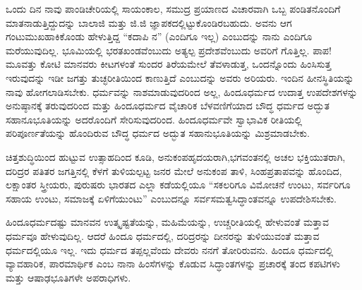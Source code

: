ಒಂದು ದಿನ ನಾವು ಪಾಂಡಿಚೇರಿಯಲ್ಲಿ ಸಾಯಂಕಾಲ, ಸಮುದ್ರ ಪ್ರಯಾಣದ ವಿಚಾರವಾಗಿ ಒಬ್ಬ ಪಂಡಿತನೊಂದಿಗೆ ಮಾತನಾಡುತ್ತಿದ್ದುದನ್ನು ಬಾಲಾಜಿ ಮತ್ತು ಜಿ.ಜಿ ಜ್ಞಾಪಕದಲ್ಲಿಟ್ಟುಕೊಂಡಿರಬಹುದು. ಅವನು ಆಗ ಗಂಟುಮುಖಹಾಕಿಕೊಂಡು ಹೇಳುತ್ತಿದ್ದ “ಕದಾಪಿ ನ” (ಎಂದಿಗೂ ಇಲ್ಲ) ಎಂಬುದನ್ನು ನಾನು ಎಂದಿಗೂ ಮರೆಯುವುದಿಲ್ಲ. ಭೂಮಿಯಲ್ಲಿ ಭರತಖಂಡವೆಂಬುದು ಅತ್ಯಲ್ಪ ಪ್ರದೇಶವೆಂಬುದು ಅವರಿಗೆ ಗೊತ್ತಿಲ್ಲ. ಪಾಪ!ಮೂವತ್ತು ಕೋಟಿ ಮಾನವರು ಕೀಟಗಳಂತೆ ಸುಂದರ ತಿರೆಯಮೇಲೆ ತೆವಳಾಡುತ್ತ, ಒಂದನ್ನೊಂದು ಹಿಂಸಿಸುತ್ತ ಇರುವುದನ್ನು ಇಡೀ ಜಗತ್ತು ತುಚ್ಛರೀತಿಯಿಂದ ಕಾಣುತ್ತಿದೆ ಎಂಬುದನ್ನು ಅವರು ಅರಿಯರು. ಇಂದಿನ ಹೀನಸ್ಥಿತಿಯನ್ನು ನಾವು ಹೋಗಲಾಡಿಸಬೇಕು. ಧರ್ಮವನ್ನು ನಾಶಮಾಡುವುದರಿಂದ ಅಲ್ಲ, ಹಿಂದೂಧರ್ಮದ ಉದಾತ್ತ ಉಪದೇಶಗಳನ್ನು ಅನುಷ್ಠಾನಕ್ಕೆ ತರುವುದರಿಂದ ಮತ್ತು ಹಿಂದೂಧರ್ಮದ ವೈಚಾರಿಕ ಬೆಳವಣಿಗೆಯಾದ ಬೌದ್ಧ ಧರ್ಮದ ಅದ್ಭುತ ಸಹಾನೂಭೂತಿಯನ್ನು ಅದರೊಂದಿಗೆ ಸೇರಿಸುವುದರಿಂದ. ಹಿಂದೂಧರ್ಮವೇ ಸ್ವಾಭಾವಿಕ ರೀತಿಯಲ್ಲಿ ಪರಿಪೂರ್ಣತೆಯನ್ನು ಹೊಂದಿರುವ ಬೌದ್ಧ ಧರ್ಮದ ಅದ್ಭುತ ಸಹಾನುಭೂತಿಯನ್ನು ಮಿಶ್ರಮಾಡಬೇಕು.

ಚಿತ್ತಶುದ್ಧಿಯಿಂದ ಹುಟ್ಟುವ ಉತ್ಸಾಹದಿಂದ ಕೂಡಿ, ಅನುಕಂಪಹೃದಯರಾಗಿ,\break ಭಗವಂತನಲ್ಲಿ ಅಚಲ ಭಕ್ತಿಯುತರಾಗಿ, ದರಿದ್ರರ ಪತಿತರ ಜಗತ್ತಿನಲ್ಲಿ ಕೆಳಗೆ ತುಳಿಯಲ್ಪಟ್ಟ ಜನರ ಮೇಲೆ ಅನುಕಂಪ ತಾಳಿ, ಸಿಂಹಪ್ರತಾಪವನ್ನು ಹೊಂದಿದ, ಲಕ್ಷಾಂತರ ಸ್ತ್ರೀಯರು, ಪುರುಷರು ಭಾರತದ ಎಲ್ಲಾ ಕಡೆಯಲ್ಲಿಯೂ “ಸಕಲರಿಗೂ ವಿಮೋಚನೆ ಉಂಟು, ಸರ್ವರಿಗೂ ಸಹಾಯ ಉಂಟು, ಸಮಾಜಕ್ಕೆ ಏಳಿಗೆಯುಂಟು” ಎಂಬುದನ್ನೂ ಸರ್ವಸಮತ್ವ\break ಸಿದ್ಧಾಂತವನ್ನೂ ಉಪದೇಶಿಸಬೇಕು.

ಹಿಂದೂಧರ್ಮದಷ್ಟು ಮಾನವನ ಉತ್ಕೃಷ್ಟತೆಯನ್ನು, ಮಹಿಮೆಯನ್ನು, ಉಚ್ಚರೀತಿಯಲ್ಲಿ ಹೇಳುವಂತೆ ಮತ್ತಾವ ಧರ್ಮವೂ ಹೇಳುವುದಿಲ್ಲ. ಆದರೆ ಹಿಂದೂ ಧರ್ಮದಲ್ಲಿ, ದರಿದ್ರರನ್ನು ದೀನರನ್ನು ತುಳಿಯುವಂತೆ ಮತ್ತಾವ ಧರ್ಮದಲ್ಲಿಯೂ ಇಲ್ಲ. ಇದು ಧರ್ಮದ ತಪ್ಪಲ್ಲವೆಂದು ದೇವರು ನನಗೆ ತೋರಿರುವನು. ಹಿಂದೂ ಧರ್ಮದಲ್ಲಿ ವ್ಯಾವಹಾರಿಕ, ಪಾರಮಾರ್ಥಿಕ ಎಂಬ ನಾನಾ ಹಿಂಸೆಗಳನ್ನು ಕೊಡುವ ಸಿದ್ಧಾಂತಗಳನ್ನು ಪ್ರಚಾರಕ್ಕೆ ತಂದ ಕಪಟಿಗಳು ಮತ್ತು ಆಷಾಢಭೂತಿಗಳೇ ಅಪರಾಧಿಗಳು.

\newpage

